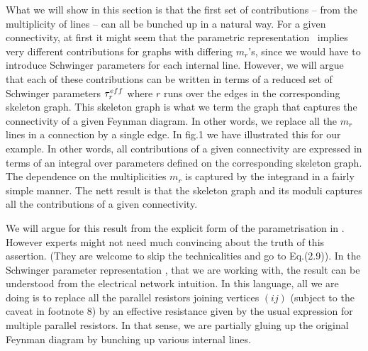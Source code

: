What we will show in this section is that the first set of
contributions -- from the multiplicity of lines -- can all be
bunched up in a natural way. For a given connectivity, at first it
might seem that the parametric representation \scal\ implies very
different contributions for graphs with differing $m_r$'s,
since we would have to introduce Schwinger parameters for each
internal line. However, we will argue that each of these
contributions can be written in terms of a reduced set of
Schwinger parameters ${\tau}^{eff}_r$ where $r$ runs over the edges in
the corresponding skeleton graph. This skeleton graph is what we
term the graph that captures the connectivity of a given Feynman
diagram. In other words, we replace all the $m_r$ lines in 
a connection by a single edge.
In fig.1 we have illustrated this for our
example. In other
words, all contributions of a given connectivity are expressed in
terms of an integral over parameters defined on the corresponding
skeleton graph. The dependence on the multiplicities $m_r$ is
captured by the integrand in a fairly simple manner.
The nett result is that the skeleton graph and its moduli captures
all the contributions of a given connectivity.

We will argue for this result from the explicit form of the parametrisation
in \scal . However experts might not need much convincing about the truth of this
assertion. (They are welcome to skip the technicalities and go to Eq.(2.9)).
In the Schwinger parameter representation \scal , that we are working with, 
the result
can be understood from the electrical network intuition. In this language, all
we are doing is to replace all the parallel resistors joining vertices $(ij)$
(subject to the caveat in footnote 8) by an effective resistance 
given by the usual
expression for multiple parallel resistors. In that sense, we are partially gluing
up the original Feynman diagram by bunching up various internal lines.

